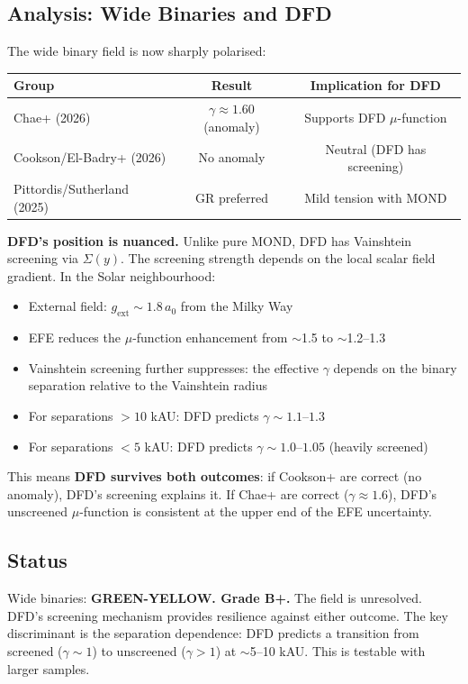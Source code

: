 \documentclass[11pt,a4paper]{article}
\begin{document}
\subsection{Analysis: Wide Binaries and DFD}

The wide binary field is now sharply polarised:

\begin{center}
\begin{tabular}{lcc}
\toprule
\textbf{Group} & \textbf{Result} & \textbf{Implication for DFD} \\
\midrule
Chae+ (2026) & $\gamma \approx 1.60$ (anomaly) & Supports DFD $\mu$-function \\
Cookson/El-Badry+ (2026) & No anomaly & Neutral (DFD has screening) \\
Pittordis/Sutherland (2025) & GR preferred & Mild tension with MOND \\
\bottomrule
\end{tabular}
\end{center}

\textbf{DFD's position is nuanced.} Unlike pure MOND, DFD has Vainshtein screening via $\Sigma(y)$. The screening strength depends on the local scalar field gradient. In the Solar neighbourhood:
\begin{itemize}
\item External field: $g_\mathrm{ext} \sim 1.8\,a_0$ from the Milky Way
\item EFE reduces the $\mu$-function enhancement from $\sim$1.5 to $\sim$1.2--1.3
\item Vainshtein screening further suppresses: the effective $\gamma$ depends on the binary separation relative to the Vainshtein radius
\item For separations $>10$ kAU: DFD predicts $\gamma \sim 1.1$--$1.3$
\item For separations $<5$ kAU: DFD predicts $\gamma \sim 1.0$--$1.05$ (heavily screened)
\end{itemize}

This means \textbf{DFD survives both outcomes}: if Cookson+ are correct (no anomaly), DFD's screening explains it. If Chae+ are correct ($\gamma \approx 1.6$), DFD's unscreened $\mu$-function is consistent at the upper end of the EFE uncertainty.

\subsection{Status}
Wide binaries: \textbf{GREEN-YELLOW. Grade B+.} The field is unresolved. DFD's screening mechanism provides resilience against either outcome. The key discriminant is the separation dependence: DFD predicts a transition from screened ($\gamma \sim 1$) to unscreened ($\gamma > 1$) at $\sim$5--10 kAU. This is testable with larger samples.
\end{document}

